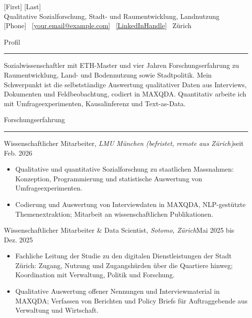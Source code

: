 \documentclass[10pt,a4paper]{article}
\newcommand{\cvsection}[1]{%
  \vspace{0.38em}\par
  {\color{cvblue}\large #1}\par
  \vspace{-0.28em}\textcolor{cvblue}{\rule{\linewidth}{0.6pt}}\par
  \vspace{0.26em}}
\newcommand{\cventry}[3]{\vspace{0.4em}#1, \textit{#2}\hfill #3\par\vspace{1pt}}
\begin{document}
\pagestyle{empty}


{\Huge [First] [Last]}\\[0.15em]
{\color{cvblue}\large Qualitative Sozialforschung, Stadt- und Raumentwicklung, Landnutzung}\\[0.5em]
[Phone] \textbullet\ \href{mailto:[your.email@example.com]}{[your.email@example.com]} \textbullet\ \href{[LinkedInURL]}{[LinkedInHandle]} \textbullet\ Zürich

\vspace{3pt}

\cvsection{Profil}

Sozialwissenschaftler mit ETH-Master und vier Jahren Forschungserfahrung zu Raumentwicklung, Land- und Bodennutzung sowie Stadtpolitik. Mein Schwerpunkt ist die selbstständige Auswertung qualitativer Daten aus Interviews, Dokumenten und Feldbeobachtung, codiert in MAXQDA. Quantitativ arbeite ich mit Umfrageexperimenten, Kausalinferenz und Text-as-Data.

\cvsection{Forschungserfahrung}

\cventry{Wissenschaftlicher Mitarbeiter}{LMU München (befristet, remote aus Zürich)}{seit Feb. 2026}
\begin{itemize}
\item Qualitative und quantitative Sozialforschung zu staatlichen Massnahmen: Konzeption, Programmierung und statistische Auswertung von Umfrageexperimenten.
\item Codierung und Auswertung von Interviewdaten in MAXQDA, NLP-gestützte Themenextraktion; Mitarbeit an wissenschaftlichen Publikationen.
\end{itemize}

\cventry{Wissenschaftlicher Mitarbeiter \& Data Scientist}{Sotomo, Zürich}{Mai 2025 bis Dez. 2025}
\begin{itemize}
\item Fachliche Leitung der Studie zu den digitalen Dienstleistungen der Stadt Zürich: Zugang, Nutzung und Zugangshürden über die Quartiere hinweg; Koordination mit Verwaltung, Politik und Forschung.
\item Qualitative Auswertung offener Nennungen und Interviewmaterial in MAXQDA; Verfassen von Berichten und Policy Briefs für Auftraggebende aus Verwaltung und Wirtschaft.
\end{itemize}
\end{document}
